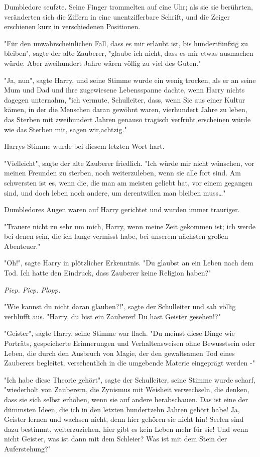 {Dumbledore seufzte. Seine Finger trommelten auf eine Uhr; als sie sie berührten, veränderten sich die Ziffern in eine unentzifferbare Schrift, und die Zeiger erschienen kurz in verschiedenen Positionen.

"Für den unwahrscheinlichen Fall, dass es mir erlaubt ist, bis hundertfünfzig zu bleiben", sagte der alte Zauberer, "glaube ich nicht, dass es mir etwas ausmachen würde. Aber zweihundert Jahre wären völlig zu viel des Guten."

"Ja, nun", sagte Harry, und seine Stimme wurde ein wenig trocken, als er an seine Mum und Dad und ihre zugewiesene Lebensspanne dachte, wenn Harry nichts dagegen unternahm, "ich vermute, Schulleiter, dass, wenn Sie aus einer Kultur kämen, in der die Menschen daran gewöhnt waren, vierhundert Jahre zu leben, das Sterben mit zweihundert Jahren genauso tragisch verfrüht erscheinen würde wie das Sterben mit, sagen wir,achtzig."

Harrys Stimme wurde bei diesem letzten Wort hart.

"Vielleicht", sagte der alte Zauberer friedlich. "Ich würde mir nicht wünschen, vor meinen Freunden zu sterben, noch weiterzuleben, wenn sie alle fort sind. Am schwersten ist es, wenn die, die man am meisten geliebt hat, vor einem gegangen sind, und doch leben noch andere, um derentwillen man bleiben muss…"

Dumbledores Augen waren auf Harry gerichtet und wurden immer trauriger.

"Trauere nicht zu sehr um mich, Harry, wenn meine Zeit gekommen ist; ich werde bei denen sein, die ich lange vermisst habe, bei unserem nächsten großen Abenteuer."

"Oh!", sagte Harry in plötzlicher Erkenntnis. "Du glaubst an ein Leben nach dem Tod. Ich hatte den Eindruck, dass Zauberer keine Religion haben?"

\emph{Piep. Piep. Plopp.}

"Wie kannst du nicht daran glauben?!", sagte der Schulleiter und sah völlig verblüfft aus. "Harry, du bist ein Zauberer! Du hast Geister gesehen!?"

"Geister", sagte Harry, seine Stimme war flach. "Du meinst diese Dinge wie Porträts, gespeicherte Erinnerungen und Verhaltensweisen ohne Bewusstsein oder Leben, die durch den Ausbruch von Magie, der den gewaltsamen Tod eines Zauberers begleitet, versehentlich in die umgebende Materie eingeprägt werden -"

"Ich habe diese Theorie gehört", sagte der Schulleiter, seine Stimme wurde scharf, "wiederholt von Zauberern, die Zynismus mit Weisheit verwechseln, die denken, dass sie sich selbst erhöhen, wenn sie auf andere herabschauen. Das ist eine der dümmsten Ideen, die ich in den letzten hundertzehn Jahren gehört habe! Ja, Geister lernen und wachsen nicht, denn hier gehören sie nicht hin! Seelen sind dazu bestimmt, weiterzuziehen, hier gibt es kein Leben mehr für sie! Und wenn nicht Geister, was ist dann mit dem Schleier? Was ist mit dem Stein der Auferstehung?"

}
